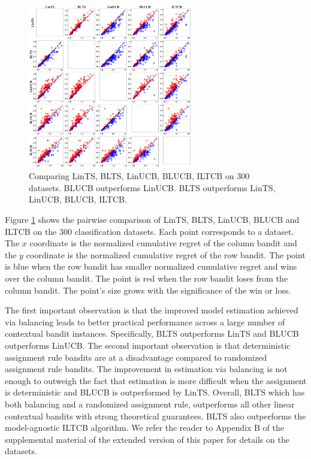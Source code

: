 \documentclass[letterpaper]{article} %
\begin{document}
\begin{figure}[!htb]
\centering
\includegraphics[width=0.855\columnwidth,height=2.83in ]{Figures/all_vs_all}
\caption{Comparing LinTS, BLTS, LinUCB, BLUCB, ILTCB on 300 datasets. BLUCB outperforms LinUCB. BLTS outperforms LinTS, LinUCB, BLUCB, ILTCB.}
\label{fig:all_vs_all}
\end{figure}

Figure \ref{fig:all_vs_all} shows the pairwise comparison of LinTS, BLTS, LinUCB, BLUCB and ILTCB on the 300 classification datasets. Each point corresponds to a dataset. The $x$ coordinate is the normalized cumulative regret of the column bandit and the $y$ coordinate is the normalized cumulative regret of the row bandit. The point is blue when the row bandit has smaller normalized cumulative regret and wins over the column bandit. The point is red when the row bandit loses from the column bandit. The point's size grows with the significance of the win or loss.

The first important observation is that the improved model estimation achieved via balancing leads to better practical performance across a large number of contextual bandit instances. Specifically, BLTS outperforms LinTS and BLUCB outperforms LinUCB.
The second important observation is that deterministic assignment rule bandits are at a disadvantage compared to randomized assignment rule bandits. The improvement in estimation via balancing is not enough to outweigh the fact that estimation is more difficult when the assignment is deterministic and BLUCB is outperformed by LinTS.
Overall, BLTS which has both balancing and a randomized assignment rule, outperforms all other linear contextual bandits with strong theoretical guarantees.
BLTS also outperforms the model-agnostic ILTCB algorithm.
We refer the reader to Appendix B of the supplemental material of the extended version of this paper \cite{dimakopoulou2017estimation} for details on the datasets.
\end{document}
